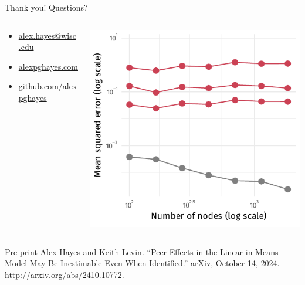 \documentclass[aspectratio=169]{beamer}
\theoremstyle{remark}
\begin{document}
\begin{frame}{Thank you! Questions?}
    \footnotesize \phantom{test} \normalsize
    \begin{columns}
        \begin{column}{0.4\textwidth}
            \begin{itemize}
                \item[]  \href{mailto:alex.hayes@wisc.edu}{alex.hayes@wisc.edu}
                \item[]  \href{https://www.alexpghayes.com}{alexpghayes.com}
                \item[]  \href{https://github.com/alexpghayes}{github.com/alexpghayes}
            \end{itemize}
        \end{column}
        \begin{column}{0.6\textwidth}
            \centering
            \includegraphics[scale=0.65]{./figures/simulations/jobtalk-last-slide.pdf}
        \end{column}
    \end{columns}
    \footnotesize
    \begin{block}{Pre-print}
        Alex Hayes and Keith Levin. “Peer Effects in the Linear-in-Means Model May Be Inestimable Even When Identified.” arXiv, October 14, 2024. \url{http://arxiv.org/abs/2410.10772}.
    \end{block}
\end{frame}
\end{document}

